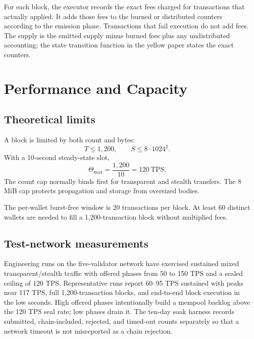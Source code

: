 \documentclass[11pt,a4paper]{article}
\begin{document}
For each block, the executor records the exact fees charged for transactions
that actually applied. It adds those fees to the burned or distributed
counters according to the emission phase. Transactions that fail execution do
not add fees. The supply is the emitted supply minus burned fees plus any
undistributed accounting; the state transition function in the yellow paper
states the exact counters.

\section{Performance and Capacity}
\label{sec:performance}

\subsection{Theoretical limits}

A block is limited by both count and bytes:
\begin{equation}
  T \le 1{,}200, \qquad S \le 8 \cdot 1024^2.
\end{equation}
With a 10-second steady-state slot,
\begin{equation}
  \Theta_{\max} = \frac{1{,}200}{10} = 120\ \mathrm{TPS}.
\end{equation}
The count cap normally binds first for transparent and stealth transfers. The
8 MiB cap protects propagation and storage from oversized bodies.

The per-wallet burst-free window is 20 transactions per block. At least 60
distinct wallets are needed to fill a 1,200-transaction block without
multiplied fees.

\subsection{Test-network measurements}

Engineering runs on the five-validator network have exercised sustained mixed
transparent/stealth traffic with offered phases from 50 to 150 TPS and a
sealed ceiling of 120 TPS. Representative runs report 60--95 TPS sustained
with peaks near 117 TPS, full 1,200-transaction blocks, and end-to-end block
execution in the low seconds. High offered phases intentionally build a
mempool backlog above the 120 TPS seal rate; low phases drain it. The ten-day
soak harness records submitted, chain-included, rejected, and timed-out
counts separately so that a network timeout is not misreported as a chain
rejection.
\end{document}
